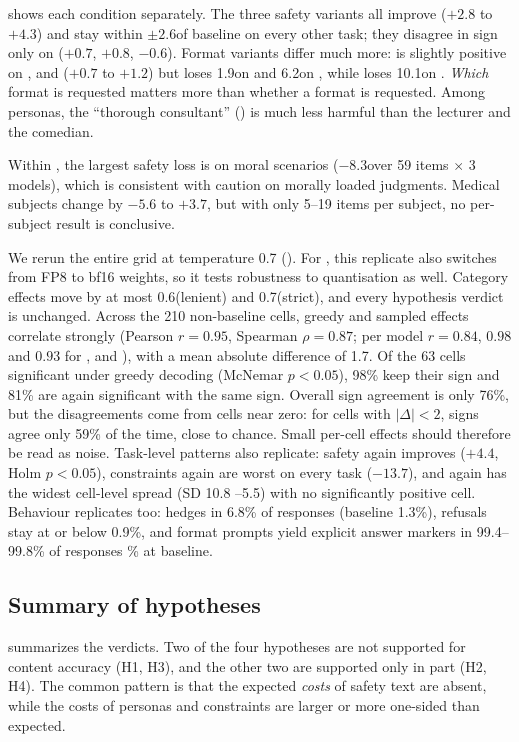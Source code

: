   shows each condition separately. The three safety variants all improve \tqa ($+2.8$ to $+4.3$\pp) and stay within $\pm2.6$\pp of baseline on every other task; they disagree in sign only on \drop ($+0.7$, $+0.8$, $-0.6$). Format variants differ much more:  is slightly positive on \gsm, \arc and \mmlus ($+0.7$ to $+1.2$\pp) but loses 1.9\pp on \tqa and 6.2\pp on \drop, while  loses 10.1\pp on \gsm. {\em Which} format is requested matters more than whether a format is requested. Among personas, the ``thorough consultant'' () is much less harmful than the lecturer and the comedian.

 Within \mmlus, the largest safety loss is on moral scenarios ($-8.3$\pp over 59 items $\times$ 3 models), which is consistent with caution on morally loaded judgments. Medical subjects change by $-5.6$ to $+3.7$\pp, but with only 5--19 items per subject, no per-subject result is conclusive.



 We rerun the entire grid at temperature 0.7 (). For \qwenthree, this replicate also switches from FP8 to bf16 weights, so it tests robustness to quantisation as well. Category effects move by at most 0.6\pp (lenient) and 0.7\pp (strict), and every hypothesis verdict is unchanged. Across the 210 non-baseline cells, greedy and sampled effects correlate strongly (Pearson $r=0.95$, Spearman $\rho=0.87$; per model $r=0.84$, $0.98$ and $0.93$ for \llama, \qwentwo and \qwenthree), with a mean absolute difference of 1.7\pp. Of the 63 cells significant under greedy decoding (McNemar $p<0.05$), 98\% keep their sign and 81\% are again significant with the same sign. Overall sign agreement is only 76\%, but the disagreements come from cells near zero: for cells with $|\Delta|<2$\pp, signs agree only 59\% of the time, close to chance. Small per-cell effects should therefore be read as noise. Task-level patterns also replicate: safety again improves \tqa ($+4.4$\pp, Holm $p<0.05$), constraints again are worst on every task (\gsm $-13.7$\pp), and \constraint again has the widest cell-level spread (SD 10.8 --5.5\pp) with no significantly positive cell. Behaviour replicates too:  hedges in 6.8\% of responses (baseline 1.3\%), refusals stay at or below 0.9\%, and format prompts yield explicit answer markers in 99.4--99.8\% of responses \% at baseline.

\subsection{Summary of hypotheses}



 summarizes the verdicts. Two of the four hypotheses are not supported for content accuracy (H1, H3), and the other two are supported only in part (H2, H4). The common pattern is that the expected {\em costs} of safety text are absent, while the costs of personas and constraints are larger or more one-sided than expected.
